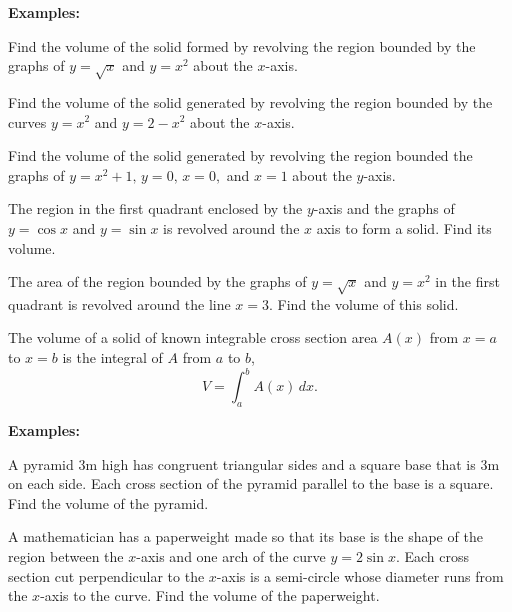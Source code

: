 \documentclass[addpoints, 12pt]{exam}
\begin{document}
\textbf{Examples:}
\begin{questions}
    \question Find the volume of the solid formed by revolving the region bounded by the graphs of $y=\sqrt{x}$ and $y=x^2$ about the $x$-axis.
    
    \question Find the volume of the solid generated by revolving the region bounded by the curves $y=x^2$ and $y=2-x^2$ about the $x$-axis.
    
    \newpage
    
    \question Find the volume of the solid generated by revolving the region bounded the graphs of $y=x^2+1,\,y=0,\,x=0,$ and $x=1$ about the $y$-axis.
    
    \question The region in the first quadrant enclosed by the $y$-axis and the graphs of $y=\cos x$ and $y=\sin x$ is revolved around the $x$ axis to form a solid. Find its volume.
    
    \question The area of the region bounded by the graphs of $y=\sqrt{x}$ and $y=x^2$ in the first quadrant is revolved around the line $x=3$. Find the volume of this solid.
    
\end{questions}

\newpage

\begin{tcolorbox}[title= VOLUME OF KNOWN CROSS SECTION,colframe=black,sharp corners,colback=white,colbacktitle=white,coltitle=black,boxrule=1pt]

    The volume of a solid of known integrable cross section area $A(x)$ from $x=a$ to $x=b$ is the integral of $A$ from $a$ to $b$,
    \[V=\int_a^b A(x)\,dx.\]
    
\end{tcolorbox}
\textbf{Examples:}

\begin{questions}
    \question A pyramid 3m high has congruent triangular sides and a square base that is 3m on each side. Each cross section of the pyramid parallel to the base is a square. Find the volume of the pyramid.
    
    
    \question A mathematician has a paperweight made so that its base is the shape of the region between the $x$-axis and one arch of the curve $y=2\sin x$. Each cross section cut perpendicular to the $x$-axis is a semi-circle whose diameter runs from the $x$-axis to the curve. Find the volume of the paperweight.
\end{questions}
\end{document}
